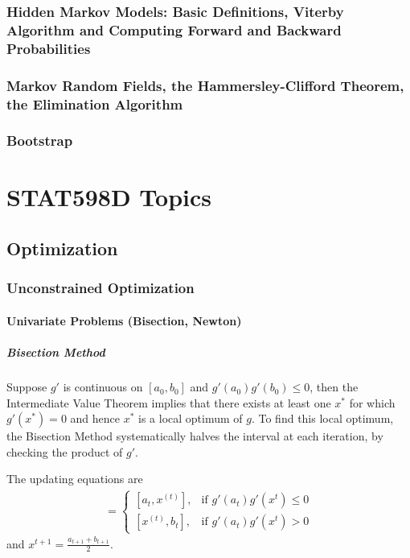 \documentclass{report}
\begin{document}
\section{Hidden Markov Models: Basic Definitions, Viterby Algorithm and Computing Forward and Backward Probabilities}
\section{Markov Random Fields, the Hammersley-Clifford Theorem, the Elimination Algorithm}
\section{Bootstrap}


\part{STAT598D Topics}

\chapter{Optimization}
\section{Unconstrained Optimization}
\subsection{Univariate Problems (Bisection, Newton)}
\subsubsection{Bisection Method}
Suppose $g'$ is continuous on $[a_0,b_0]$ and $g'(a_0)g'(b_0) \le 0$, then the Intermediate Value Theorem implies that there exists at least one $x^*$ for which $g'(x^*) = 0$ and hence $x^*$ is a local optimum of $g$. To find this local optimum, the Bisection Method systematically halves the interval at each iteration, by checking the product of $g'$.

The updating equations are
\begin{align}
[a_{t+1},b_{t+1}] =
	\begin{cases}
		[a_t,x^{(t)}], & \mbox{if } g'(a_t)g'(x^{t}) \le 0 \\
		[x^{(t)},b_t], & \mbox{if } g'(a_t)g'(x^{t}) > 0
	\end{cases}
\end{align}
and $x^{t+1} = \frac{a_{t+1}+b_{t+1}}{2}$.
\end{document}
